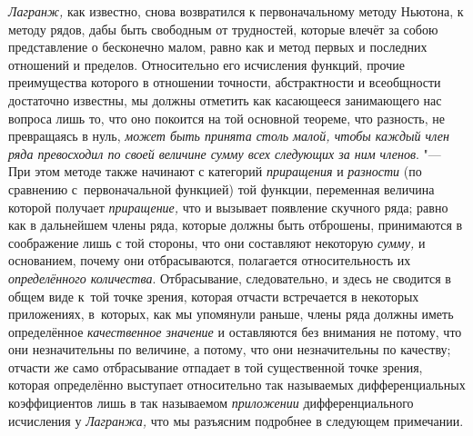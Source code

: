 {\em Лагранж,} как известно, снова возвратился к первоначальному методу
Ньютона, к методу рядов, дабы быть свободным от трудностей, которые влечёт за
собою представление о бесконечно малом, равно как и метод первых и последних
отношений и пределов. Относительно его исчисления функций, прочие преимущества
которого в отношении точности, абстрактности и всеобщности достаточно известны,
мы должны отметить как касающееся занимающего нас вопроса лишь то, что оно
покоится на той основной теореме, что разность, не превращаясь в нуль,
{\em может быть принята столь малой, чтобы каждый член ряда превосходил по
своей величине сумму всех следующих за ним членов}. "--- При этом методе также
начинают с категорий {\em приращения} и {\em разности} (по сравнению
с~первоначальной функцией) той функции, переменная величина которой получает
{\em приращение,} что и вызывает появление скучного ряда; равно как в
дальнейшем члены ряда, которые должны быть отброшены, принимаются в соображение
лишь с той стороны, что они составляют некоторую {\em сумму,} и основанием,
почему они отбрасываются, полагается относительность их {\em определённого
количества}. Отбрасывание, следовательно, и здесь не сводится в общем виде
к~той точке зрения, которая отчасти встречается в некоторых приложениях,
в~которых, как мы упомянули раньше, члены ряда должны иметь определённое
{\em качественное значение} и оставляются без внимания не потому, что они
незначительны по величине, а потому, что они незначительны по качеству;
отчасти же само отбрасывание отпадает в той существенной точке зрения,
которая определённо выступает относительно так называемых дифференциальных
коэффициентов лишь в так называемом {\em приложении} дифференциального
исчисления у {\em Лагранжа,} что мы разъясним подробнее в следующем примечании.

